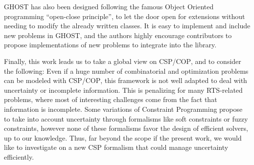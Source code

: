 \documentclass[journal]{IEEEtran}
\newcommand{\csp}{\textsc{CSP}\xspace}
\newcommand{\cop}{\textsc{COP}\xspace}
\newcommand{\ghost}{\textsc{GHOST}\xspace}
\begin{document}
\ghost has  also been  designed following  the famous  Object Oriented
programming  ``open-close  principle'',  to  let  the  door  open  for
extensions without needing  to modify the already  written classes. It
is  easy to  implement and  include new  problems in  \ghost, and  the
authors highly  encourage contributors  to propose  implementations of
new problems to integrate into the library.

Finally, this work leads us to take a global view on \csp/\cop, and to
consider the  following: Even  if a huge  number of  combinatorial and
optimization problems can be modeled with \csp/\cop, this framework is
not   well   adapted   to   deal  with   uncertainty   or   incomplete
information. This  is penalizing for many  RTS-related problems, where
most of interesting challenges come  from the fact that information is
incomplete. Some variations of  Constraint Programming propose to take
into account  uncertainty through formalisms like  soft constraints or
fuzzy constraints, however  none of these formalisms  favor the design
of efficient solvers, up to our  knowledge. Thus, far beyond the scope
if  the present  work, we  would  like to  investigate on  a new  \csp
formalism that could manage uncertainty efficiently.




\ifCLASSOPTIONcaptionsoff
  \newpage
\fi

                                                    



\end{document}
